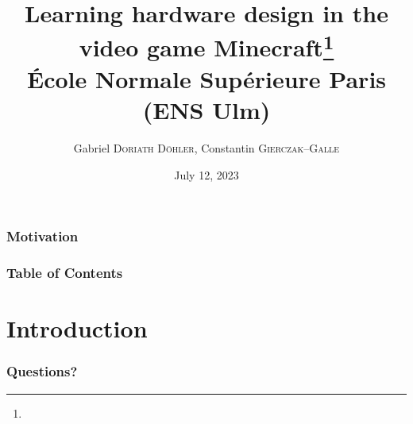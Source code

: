 \documentclass{beamer}
\title{Learning hardware design in the video game Minecraft\footnote{\tiny{}\reproduce}\\\small{} École Normale Supérieure Paris (ENS Ulm)}
\author{Gabriel \textsc{Doriath Döhler}, Constantin \textsc{Gierczak--Galle}}
\date{July 12, 2023}
\begin{document}
\beamertemplatenavigationsymbolsempty
{}

\maketitle

\begin{frame}[fragile]
\frametitle{Motivation}

\end{frame}

\begin{frame}[fragile]
\frametitle{Table of Contents}
\tableofcontents
\end{frame}

\section{Introduction}

\begin{frame}[fragile]
\frametitle{Questions?}
\end{frame}

\newpage


\end{document}
